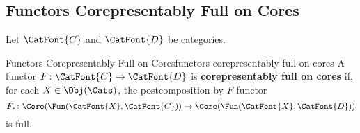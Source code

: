 \subsection{Functors Corepresentably Full on Cores}\label{subsection-functors-corepresentably-full-on-cores}
Let $\CatFont{C}$ and $\CatFont{D}$ be categories.
\begin{definition}{Functors Corepresentably Full on Cores}{functors-corepresentably-full-on-cores}%
    A functor $F\colon\CatFont{C}\to\CatFont{D}$ is \textbf{corepresentably full on cores} if, for each $X\in\Obj(\Cats)$, the postcomposition by $F$ functor
    \[
        F_{*}%
        \colon%
        \Core(\Fun(\CatFont{X},\CatFont{C}))%
        \to
        \Core(\Fun(\CatFont{X},\CatFont{D}))%
    \]%
    is full.
\end{definition}
